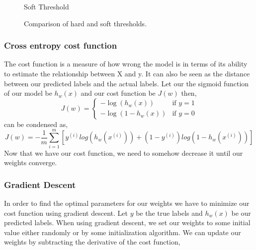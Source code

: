 \begin{figure}
\begin{subFigure}{.5\textwidth}
  \caption{Soft Threshold}
  \label{fig:soft-threshold}
\end{subFigure}
\caption{Comparison of hard and soft thresholds\cite{10.5555/1671238}.}
\label{fig:thresholds}
\end{figure}
\subsubsection{Cross entropy cost function}
The cost function is a measure of how wrong the model is in terms of its ability to estimate the relationship between X and y. It can also be seen as the distance between our predicted labels and the actual labels.
Let our the sigmoid function of our model be $h_{w}(x)$ and our cost function be $J(w)$ then,
\abovedisplayskip=0pt\relax
\[
J(w) =
\begin{cases}
-\log(h_{w}(x)) & \text{if } y=1\\
-\log(1 - h_{w}(x)) & \text{if } y=0
\end{cases}
\]
can be condensed as,
\begin{equation}
J(w) = - \frac{1}{m} \sum_{i=1}^{m} \left[ y^{(i)}log(h_{w}(x^{(i)})) + (1 - y^{(i)})log(1-h_{w}(x^{(i)}))\right]
\end{equation}
Now that we have our cost function, we need to somehow decrease it until our weights converge.

\subsubsection{Gradient Descent}
In order to find the optimal parameters for our weights we have to minimize our cost function using gradient descent. Let $y$ be the true labels and $h_{w}(x)$ be our predicted labels. When using gradient descent, we set our weights to some initial value either randomly or by some initialization algorithm. We can update our weights by subtracting the derivative of the cost function,

